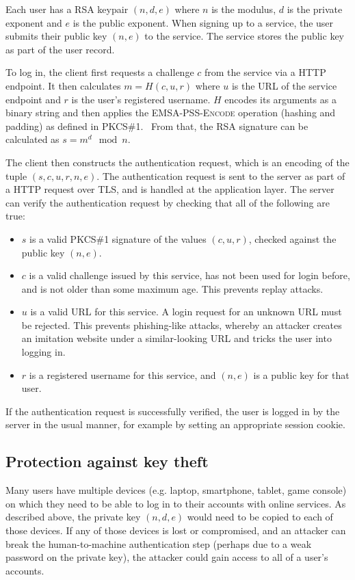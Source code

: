 Each user has a RSA keypair $(n, d, e)$ where $n$ is the modulus, $d$ is the private exponent and
$e$ is the public exponent. When signing up to a service, the user submits their public key
$(n, e)$ to the service. The service stores the public key as part of the user record.

To log in, the client first requests a challenge $c$ from the service via a HTTP endpoint. It then
calculates $m = H(c, u, r)$ where $u$ is the URL of the service endpoint and $r$ is the user's
registered username. $H$ encodes its arguments as a binary string and then applies the
\textsc{EMSA-PSS-Encode} operation (hashing and padding) as defined in PKCS\#1.~\cite{PKCS1} From
that, the RSA signature can be calculated as $s = m^d \mod n$.

The client then constructs the authentication request, which is an encoding of the tuple
$(s, c, u, r, n, e)$. The authentication request is sent to the server as part of a HTTP request
over TLS, and is handled at the application layer. The server can verify the authentication request
by checking that all of the following are true:
\begin{itemize}
\item $s$ is a valid PKCS\#1 signature of the values $(c, u, r)$, checked against the public key
$(n, e)$.
\item $c$ is a valid challenge issued by this service, has not been used for login before, and is
not older than some maximum age. This prevents replay attacks.
\item $u$ is a valid URL for this service. A login request for an unknown URL must be rejected.
This prevents phishing-like attacks, whereby an attacker creates an imitation website under a
similar-looking URL and tricks the user into logging in.
\item $r$ is a registered username for this service, and $(n, e)$ is a public key for that user.
\end{itemize}
If the authentication request is successfully verified, the user is logged in by the server in the
usual manner, for example by setting an appropriate session cookie.

\subsection{Protection against key theft}

Many users have multiple devices (e.g. laptop, smartphone, tablet, game console) on which they need
to be able to log in to their accounts with online services. As described above, the private key
$(n, d, e)$ would need to be copied to each of those devices. If any of those devices is lost or
compromised, and an attacker can break the human-to-machine authentication step (perhaps due to a
weak password on the private key), the attacker could gain access to all of a user's accounts.

